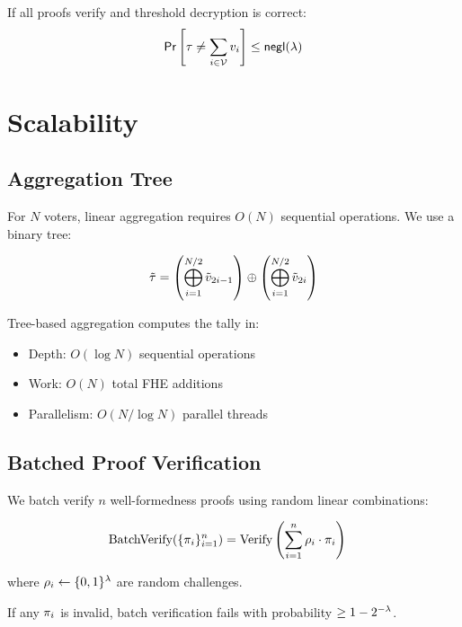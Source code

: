 \documentclass{../shared/luxfhe}
\begin{document}
\begin{theorem}
If all proofs verify and threshold decryption is correct:
\[
\mathsf{Pr}\left[\tau \neq \sum_{i \in \mathcal{V}} v_i\right] \leq \mathsf{negl}(\lambda)
\]
\end{theorem}

\section{Scalability}

\subsection{Aggregation Tree}

For $N$ voters, linear aggregation requires $O(N)$ sequential operations. We use a binary tree:

\[
\tilde{\tau} = \left(\bigoplus_{i=1}^{N/2} \tilde{v}_{2i-1}\right) \oplus \left(\bigoplus_{i=1}^{N/2} \tilde{v}_{2i}\right)
\]

\begin{theorem}
Tree-based aggregation computes the tally in:
\begin{itemize}[noitemsep]
    \item Depth: $O(\log N)$ sequential operations
    \item Work: $O(N)$ total FHE additions
    \item Parallelism: $O(N / \log N)$ parallel threads
\end{itemize}
\end{theorem}

\subsection{Batched Proof Verification}

We batch verify $n$ well-formedness proofs using random linear combinations:

\begin{align}
\text{BatchVerify}(\{\pi_i\}_{i=1}^n) &= \text{Verify}\left(\sum_{i=1}^n \rho_i \cdot \pi_i\right)
\end{align}

where $\rho_i \gets \{0,1\}^\lambda$ are random challenges.

\begin{theorem}
If any $\pi_i$ is invalid, batch verification fails with probability $\geq 1 - 2^{-\lambda}$.
\end{theorem}
\end{document}
